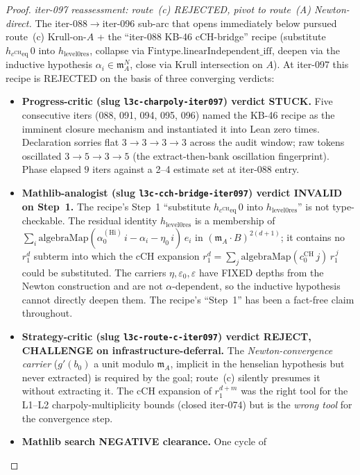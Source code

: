 \begin{proof}
\textit{iter-097 reassessment: route~(c) REJECTED, pivot to
route~(A) Newton-direct.} The iter-088$\to$iter-096 sub-arc that
opens immediately below pursued route~(c) Krull-on-$A$ + the
``iter-088 KB-46 cCH-bridge'' recipe (substitute $h_{c^{\mathrm{CH}}
\mathrm{eq}}\,0$ into $h_{\mathrm{level} 0\mathrm{res}}$, collapse
via $\mathrm{Fintype.linearIndependent\_iff}$, deepen via the
inductive hypothesis $\alpha_i \in \mathfrak m_A^N$, close via Krull
intersection on $A$). At iter-097 this recipe is REJECTED on the
basis of three converging verdicts:
\begin{itemize}
\item \textbf{Progress-critic (slug \texttt{l3c-charpoly-iter097})
verdict STUCK.} Five consecutive iters (088, 091, 094, 095, 096)
named the KB-46 recipe as the imminent closure mechanism and
instantiated it into Lean zero times. Declaration sorries flat
$3 \to 3 \to 3 \to 3$ across the audit window; raw tokens
oscillated $3 \to 5 \to 3 \to 5$ (the extract-then-bank
oscillation fingerprint). Phase elapsed $9$ iters against a
2--4 estimate set at iter-088 entry.
\item \textbf{Mathlib-analogist (slug \texttt{l3c-cch-bridge-iter097})
verdict INVALID on Step~1.} The recipe's Step~1 ``substitute
$h_{c^{\mathrm{CH}}\mathrm{eq}}\,0$ into $h_{\mathrm{level} 0
\mathrm{res}}$'' is not type-checkable. The residual identity
$h_{\mathrm{level} 0\mathrm{res}}$ is a membership of
$\sum_i \mathrm{algebraMap}(\alpha^{(\mathrm{Hi})}_0\,i - \alpha_i
- \eta_0\,i)\,e_i$ in $(\mathfrak m_A \cdot B)^{2(d+1)}$; it
contains no $r_1^d$ subterm into which the cCH expansion
$r_1^d = \sum_j \mathrm{algebraMap}(c^{\mathrm{CH}}_0\,j)\,
r_1^{\,j}$ could be substituted. The carriers
$\eta, \varepsilon_0, \varepsilon$ have FIXED depths from the
Newton construction and are not $\alpha$-dependent, so the
inductive hypothesis cannot directly deepen them. The recipe's
``Step~1'' has been a fact-free claim throughout.
\item \textbf{Strategy-critic (slug \texttt{l3c-route-c-iter097})
verdict REJECT, CHALLENGE on infrastructure-deferral.} The
\emph{Newton-convergence carrier} ($g'(b_0)$ a unit modulo
$\mathfrak m_A$, implicit in the henselian hypothesis but never
extracted) is required by the goal; route~(c) silently presumes
it without extracting it. The cCH expansion of $r_1^{d+m}$ was
the right tool for the L1--L2 charpoly-multiplicity bounds
(closed iter-074) but is the \emph{wrong tool} for the
convergence step.
\item \textbf{Mathlib search NEGATIVE clearance.} One cycle of

\end{itemize}
\end{proof}
